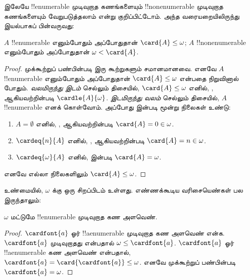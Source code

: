 \documentclass[../../../include/open-logic-section]{subfiles}
\begin{document}
 இலேயே
!!{enumerable} முடிவுறாத கணங்களையும் !!{nonenumerable}
முடிவுறாத கணங்களையும் வேறுபடுத்தலாம் என்று குறிப்பிட்டோம்.
அந்த வரையறையிலிருந்து இயல்பாகப் பின்வருவது:

\begin{prop}
$A$ !!{enumerable} எனும்போதும் அப்போதுதான் $\card{A} \leq \omega$;
$A$ !!{nonenumerable} எனும்போதும் அப்போதுதான்
$\omega < \card{A}$.
\end{prop}

\begin{proof}
முக்கூற்றுப் பண்பின்படி இரு கூற்றுகளும் சமானமானவை. எனவே
$A$ !!{enumerable} எனும்போதும் அப்போதுதான்
$\card{A} \leq \omega$ என்பதை நிறுவினால் போதும்.
\emph{வலமிருந்து இடம்} செல்லும் திசையில், $\card{A} \leq \omega$
எனில், ,
 ஆகியவற்றின்படி $\cardle{A}{\omega}$.
\emph{இடமிருந்து வலம்} செல்லும் திசையில், $A$ !!{enumerable} எனக்
கொள்வோம். அப்போது  இன்படி
மூன்று நிலைகள் உண்டு:
\begin{enumerate}
	\item $A = \emptyset$ எனில்,
	,
	ஆகியவற்றின்படி $\card{A} = 0 \in \omega$.
	\item $\cardeq{n}{A}$ எனில்,
	,
	ஆகியவற்றின்படி $\card{A} = n \in \omega$.
	\item $\cardeq{\omega}{A}$ எனில்,
 இன்படி $\card{A} = \omega$.
\end{enumerate}
எனவே எல்லா நிலைகளிலும் $\card{A} \leq \omega$.
\end{proof}
\noindent
உண்மையில், $\omega$ க்கு ஒரு சிறப்பிடம் உள்ளது.
எண்ணக்கூடிய வரிசையெண்கள் பல இருந்தாலும்:

\begin{cor}
$\omega$ மட்டுமே !!{enumerable} முடிவுறாத கண அளவெண்.
\end{cor}

\begin{proof}
$\cardfont{a}$ ஓர் !!a{enumerable} முடிவுறாத கண அளவெண் என்க.
$\cardfont{a}$ முடிவுறாதது என்பதால் $\omega \leq \cardfont{a}$.
$\cardfont{a}$ ஓர் !!a{enumerable} கண அளவெண் என்பதால்,
$\cardfont{a} = \card{\cardfont{a}} \leq \omega$.
எனவே முக்கூற்றுப் பண்பின்படி $\cardfont{a} = \omega$.
\end{proof}
\end{document}
